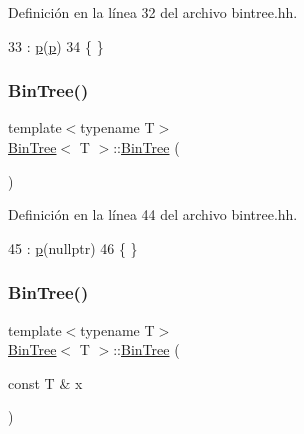 Definición en la línea 32 del archivo bintree.\+hh.


\begin{DoxyCode}
33     :   \mbox{\hyperlink{class_bin_tree_afe3647af1dda90f6ddf1deee6560fcf1}{p}}(\mbox{\hyperlink{class_bin_tree_afe3647af1dda90f6ddf1deee6560fcf1}{p}})
34     \{   \}
\end{DoxyCode}
\mbox{\label{class_bin_tree_a47eef22d29cd023449d97c073c08e5b6}} 
\subsubsection{\texorpdfstring{Bin\+Tree()}{BinTree()}\hspace{0.1cm}{\footnotesize\ttfamily [2/4]}}
{\footnotesize\ttfamily template$<$typename T$>$ \\
\mbox{\hyperlink{class_bin_tree}{Bin\+Tree}}$<$ T $>$\+::\mbox{\hyperlink{class_bin_tree}{Bin\+Tree}} (\begin{DoxyParamCaption}{ }\end{DoxyParamCaption})}



Definición en la línea 44 del archivo bintree.\+hh.


\begin{DoxyCode}
45     :   \mbox{\hyperlink{class_bin_tree_afe3647af1dda90f6ddf1deee6560fcf1}{p}}(\textcolor{keyword}{nullptr})
46     \{   \}
\end{DoxyCode}
\mbox{\label{class_bin_tree_a1ab686e0bcf990093ff91fe71744c1a4}} 
\subsubsection{\texorpdfstring{Bin\+Tree()}{BinTree()}\hspace{0.1cm}{\footnotesize\ttfamily [3/4]}}
{\footnotesize\ttfamily template$<$typename T$>$ \\
\mbox{\hyperlink{class_bin_tree}{Bin\+Tree}}$<$ T $>$\+::\mbox{\hyperlink{class_bin_tree}{Bin\+Tree}} (\begin{DoxyParamCaption}\item[{const T \&}]{x }\end{DoxyParamCaption})}




